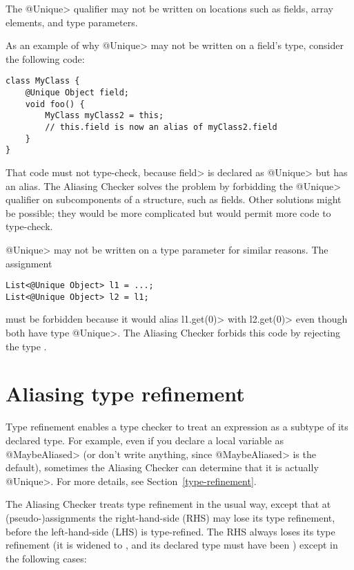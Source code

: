 The \<@Unique> qualifier may not be written on locations such as fields,
array elements, and type parameters.

As an example of why \<@Unique> may not be written on a field's type,
consider the following code:

\begin{Verbatim}
class MyClass {
    @Unique Object field;
    void foo() {
        MyClass myClass2 = this;
        // this.field is now an alias of myClass2.field
    }
}
\end{Verbatim}

That code must not type-check, because \<field> is declared as \<@Unique>
but has an alias.  The Aliasing Checker solves the problem by forbidding
the \<@Unique> qualifier on subcomponents of a structure, such as fields.
Other solutions might be possible; they would be more complicated but would
permit more code to type-check.

\<@Unique> may not be written on a type parameter for similar reasons.
The assignment

\begin{Verbatim}
List<@Unique Object> l1 = ...;
List<@Unique Object> l2 = l1;
\end{Verbatim}

\noindent
must be forbidden because it would alias \<l1.get(0)> with \<l2.get(0)>
even though both have type \<@Unique>.  The Aliasing Checker forbids this
code by rejecting the type .


\section{Aliasing type refinement\label{aliasing-refinement}}

Type refinement enables a type checker to treat an expression as a subtype
of its declared type.  For example, even if you declare a local variable as
\<@MaybeAliased> (or don't write anything, since \<@MaybeAliased> is the
default), sometimes the Aliasing Checker can determine that it is actually
\<@Unique>.
For more details, see Section~\ref{type-refinement}.

The Aliasing Checker treats type refinement in the usual way,
except that at (pseudo-)assignments
the right-hand-side (RHS) may lose its type refinement, before the
left-hand-side (LHS) is type-refined.
The RHS always loses its type refinement (it is widened to
, and its declared type must have been
) except in the following cases:

